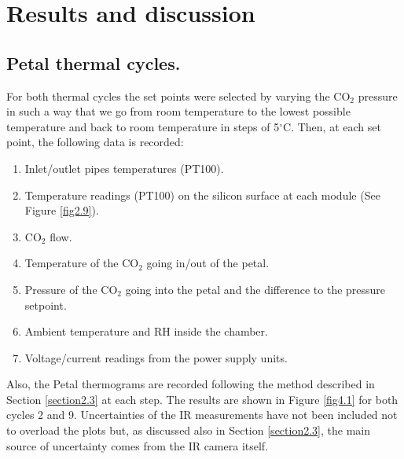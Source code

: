 \pagestyle{standard}

\chapter{Results and discussion}\label{chapter4}

	\thispagestyle{chapter-first-page}

	\section{Petal thermal cycles.}\label{section4.1}
	
		For both thermal cycles the set points were selected by varying the CO$_{2}$ pressure in such a way that we go from room temperature to the lowest possible temperature and back to room temperature in steps of 5\space$^{\circ}$C. Then, at each set point, the following data is recorded:
	
		\begin{enumerate}[label={\arabic*)}]
			\item Inlet/outlet pipes temperatures (PT100).
			\item Temperature readings (PT100) on the silicon surface at each module (See Figure \ref{fig2.9}).
			\item CO$_{2}$ flow.
			\item Temperature of the CO$_{2}$ going in/out of the petal.
			\item Pressure of the CO$_{2}$ going into the petal and the difference to the pressure setpoint.
			\item Ambient temperature and RH inside the chamber.
			\item Voltage/current readings from the power supply units.
		\end{enumerate}
	
		Also, the Petal thermograms are recorded following the method described in Section \ref{section2.3} at each step. The results are shown in Figure \ref{fig4.1} for both cycles 2 and 9. Uncertainties of the IR measurements have not been included not to overload the plots but, as discussed also in Section \ref{section2.3}, the main source of uncertainty comes from the IR camera itself. 
	
